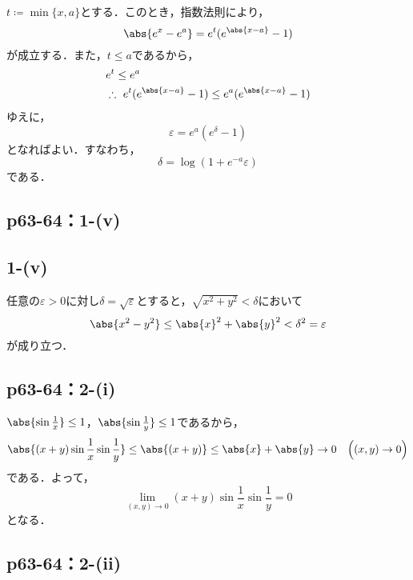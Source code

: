 \documentclass[a4paper,10pt,fleqn]{ltjsarticle}
\begin{document}
\begin{tleftbar}
    $t \coloneqq \min \{x,a\}$とする．このとき，指数法則により，
    \[
        \abs{e^x-e^a}=e^t (e^{\abs{x-a}}-1)
    \]
    が成立する．また，$t \le a$であるから，
    \begin{align*}
       & e^t \le e^a \\
        & \therefore ~ e^t(e^{\abs{x-a}}-1) \le e^a(e^{\abs{x-a}}-1)
    \end{align*}
    ゆえに，
    \[
        \varepsilon = e^a (e^\delta -1)
    \]
    となればよい．すなわち，
    \[
        \delta = \log (1+e^{-a}\varepsilon)
    \]
    である．
\end{tleftbar}


\subsection*{p63-64：1-(v)}



\subsection*{1-(v)}
  \begin{leftbar}
    任意の$\varepsilon > 0$に対し$\delta = \sqrt{\varepsilon}$とすると，$\sqrt{x^2 + y^2} < \delta$において
    \[
      \abs{x^2-y^2} \leq \abs{x}^2 + \abs{y}^2 < \delta^2 = \varepsilon
    \]
    が成り立つ．
  \end{leftbar}

\subsection*{p63-64：2-(i)}

\begin{tleftbar}
    $\abs{\sin \frac{1}{x}} \le 1$，$\abs{\sin \frac{1}{y}} \le 1$であるから，
    \[
        \abs{(x+y) \sin \frac{1}{x} \sin \frac{1}{y}} \le \abs{(x+y)} \le \abs{x}+\abs{y} \to 0 \quad  \Bigl( (x,y) \to 0 \Bigl)
    \]
    である．よって，
    \[
        \lim_{(x,y)\to 0} (x+y) \sin \frac{1}{x} \sin \frac{1}{y} =0
    \]
    となる．
\end{tleftbar}

\subsection*{p63-64：2-(ii)}
\end{document}
